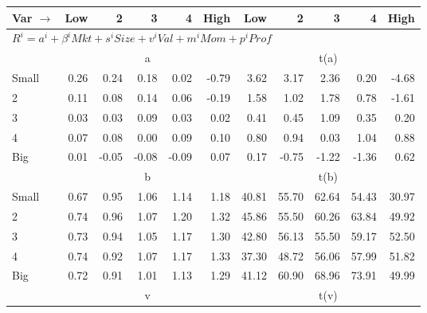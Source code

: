 
\begin{tabular}{lrrrrrrrrrr}
  \toprule
    Var $\rightarrow$ & Low & 2 & 3 & 4 & High & Low & 2 & 3 & 4 & High \\ 
  \midrule
  \multicolumn{11}{l}{$R^i=a^i+\beta^iMkt+s^iSize+v^iVal+m^iMom+p^iProf$} \\

  
    
      & \multicolumn{5}{c}{a} & \multicolumn{5}{c}{t(a)}
    
    \\
      \cmidrule(r){2-6} \cmidrule(r){7-11}

    Small   & 0.26  & 0.24  & 0.18  & 0.02  & -0.79  & 3.62  & 3.17  & 2.36  & 0.20  & -4.68  \\
         2  & 0.11  & 0.08  & 0.14  & 0.06  & -0.19  & 1.58  & 1.02  & 1.78  & 0.78  & -1.61  \\
         3  & 0.03  & 0.03  & 0.09  & 0.03  & 0.02  & 0.41  & 0.45  & 1.09  & 0.35  & 0.20  \\
         4  & 0.07  & 0.08  & 0.00  & 0.09  & 0.10  & 0.80  & 0.94  & 0.03  & 1.04  & 0.88  \\
    Big     & 0.01  & -0.05  & -0.08  & -0.09  & 0.07  & 0.17  & -0.75  & -1.22  & -1.36  & 0.62  \\

  
    
      & \multicolumn{5}{c}{b} & \multicolumn{5}{c}{t(b)}
    
    \\
      \cmidrule(r){2-6} \cmidrule(r){7-11}

    Small   & 0.67  & 0.95  & 1.06  & 1.14  & 1.18  & 40.81  & 55.70  & 62.64  & 54.43  & 30.97  \\
         2  & 0.74  & 0.96  & 1.07  & 1.20  & 1.32  & 45.86  & 55.50  & 60.26  & 63.84  & 49.92  \\
         3  & 0.73  & 0.94  & 1.05  & 1.17  & 1.30  & 42.80  & 56.13  & 55.50  & 59.17  & 52.50  \\
         4  & 0.74  & 0.92  & 1.07  & 1.17  & 1.33  & 37.30  & 48.72  & 56.06  & 57.99  & 51.82  \\
    Big     & 0.72  & 0.91  & 1.01  & 1.13  & 1.29  & 41.12  & 60.90  & 68.96  & 73.91  & 49.99  \\

  
    
      & \multicolumn{5}{c}{v} & \multicolumn{5}{c}{t(v)}
    
    \\
      \cmidrule(r){2-6} \cmidrule(r){7-11}


\end{tabular}
